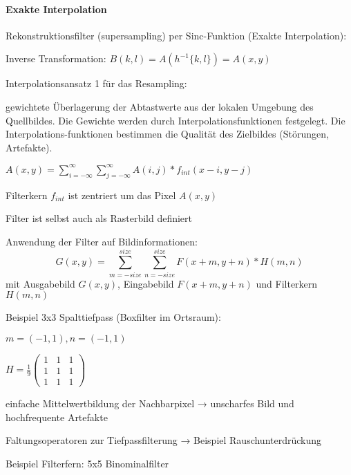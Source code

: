 \documentclass[landscape]{article}
\begin{document}
\begin{multicols}{3}
  \paragraph{Exakte Interpolation}
  Rekonstruktionsfilter (supersampling) per Sinc-Funktion (Exakte Interpolation):
  \begin{itemize*}
    \item Inverse Transformation: $B(k, l) = A(h^{-1} \{k, l\}) = A(x, y )$
    \item Interpolationsansatz 1 für das Resampling:
    \begin{itemize*}
      \item gewichtete Überlagerung der Abtastwerte aus der lokalen Umgebung des Quellbildes. Die Gewichte werden durch Interpolationsfunktionen festgelegt. Die Interpolations-funktionen bestimmen die Qualität des Zielbildes (Störungen, Artefakte).
      \item $A(x,y)=\sum_{i=-\infty}^{\infty}\sum_{j=-\infty}^{\infty}A(i,j) * f_{int}(x-i, y-j)$
      \item Filterkern $f_{int}$ ist zentriert um das Pixel $A(x, y)$
      \item Filter ist selbst auch als Rasterbild definiert
    \end{itemize*}
  \end{itemize*}
  
  Anwendung der Filter auf Bildinformationen: 
  $$G(x,y)=\sum_{m=-size}^{size} \sum_{n=-size}^{size} F(x+m, y+n) * H(m,n)$$
  mit Ausgabebild $G(x,y)$, Eingabebild $F(x+m,y+n)$ und Filterkern $H(m,n)$
  
  Beispiel 3x3 Spalttiefpass (Boxfilter im Ortsraum):
  \begin{itemize*}
    \item $m=(-1,1), n=(-1,1)$
    \item $H=\frac{1}{9} \begin{pmatrix} 1&1&1\\ 1&1&1 \\ 1&1&1 \end{pmatrix}$
    \item einfache Mittelwertbildung der Nachbarpixel → unscharfes Bild und hochfrequente Artefakte
    \item Faltungsoperatoren zur Tiefpassfilterung → Beispiel Rauschunterdrückung
  \end{itemize*}
  
  Beispiel Filterfern: 5x5 Binominalfilter
  

\end{multicols}
\end{document}
